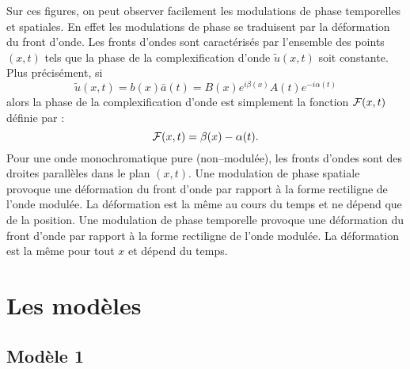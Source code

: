 \documentclass{book}
\begin{document}
Sur ces figures, on peut observer facilement les modulations de phase
temporelles et spatiales. En effet les modulations de phase se
traduisent par la d\'eformation du front d'onde.
Les fronts d'ondes sont caract\'eris\'es par l'ensemble des points
$(x,t)$ tels 
que la phase de la complexification d'onde $\tilde{u}(x,t)$ soit
constante. Plus pr\'ecis\'ement, si 
\begin{equation}
\tilde{u}(x,t)=b(x)\bar a(t)=B(x)e^{i \beta(x)}A(t)e^{-i \alpha(t)}
\end{equation}
alors la phase de la complexification  d'onde est simplement la
fonction  ${\cal F}(x,t)$ d\'efinie par :
\begin{equation}
 {\cal F}(x,t)=\beta(x)-\alpha(t).
\end{equation}
Pour une onde monochromatique pure (non--modul\'ee), les fronts d'ondes
sont 
des droites parall\`eles dans le plan $(x,t)$.
Une modulation de phase  spatiale provoque une d\'eformation du front
d'onde par rapport \`a la forme rectiligne de l'onde modul\'ee. La
d\'eformation est la m\^eme au cours du temps et ne d\'epend que de la
position.
Une modulation de phase  temporelle provoque une d\'eformation du front
d'onde par rapport \`a la forme rectiligne de l'onde modul\'ee. La
d\'eformation est la m\^eme pour tout $x$ et d\'epend du temps.


\part{Les mod\`eles}\label{partmodel}



\chapter{Mod\`ele 1}\label{chapmodeleun}
\end{document}
